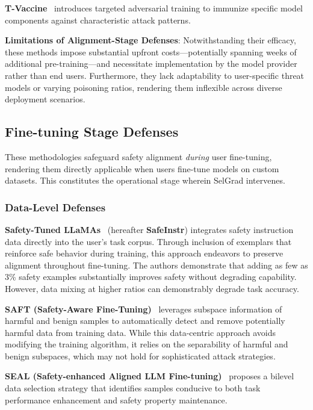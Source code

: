 \textbf{T-Vaccine}~\cite{wang2024tvaccine} introduces targeted adversarial training to immunize specific model components against characteristic attack patterns.

\textbf{Limitations of Alignment-Stage Defenses}: Notwithstanding their efficacy, these methods impose substantial upfront costs---potentially spanning weeks of additional pre-training---and necessitate implementation by the model provider rather than end users. Furthermore, they lack adaptability to user-specific threat models or varying poisoning ratios, rendering them inflexible across diverse deployment scenarios.

\subsection{Fine-tuning Stage Defenses}
\label{subsec:finetuning_stage}

These methodologies safeguard safety alignment \textit{during} user fine-tuning, rendering them directly applicable when users fine-tune models on custom datasets. This constitutes the operational stage wherein SelGrad intervenes.

\subsubsection{Data-Level Defenses}

\textbf{Safety-Tuned LLaMAs}~\cite{bianchi2024safetytuned} (hereafter \textbf{SafeInstr}) integrates safety instruction data directly into the user's task corpus. Through inclusion of exemplars that reinforce safe behavior during training, this approach endeavors to preserve alignment throughout fine-tuning. The authors demonstrate that adding as few as 3\% safety examples substantially improves safety without degrading capability. However, data mixing at higher ratios can demonstrably degrade task accuracy.

\textbf{SAFT (Safety-Aware Fine-Tuning)}~\cite{chen2024saft} leverages subspace information of harmful and benign samples to automatically detect and remove potentially harmful data from training data. While this data-centric approach avoids modifying the training algorithm, it relies on the separability of harmful and benign subspaces, which may not hold for sophisticated attack strategies.

\textbf{SEAL (Safety-enhanced Aligned LLM Fine-tuning)}~\cite{chen2024seal} proposes a bilevel data selection strategy that identifies samples conducive to both task performance enhancement and safety property maintenance.

